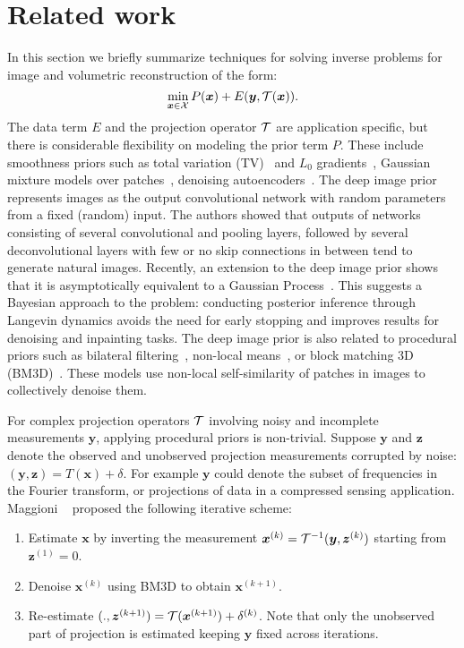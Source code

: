 \section{Related work}
\label{sec:related}

In this section we briefly summarize techniques for solving inverse problems for image and volumetric reconstruction of the form:
\begin{equation}
\label{eqn:inverse-problems}
\min_{\bm{x} \in {\cal X}} P(\bm{x}) + E(\bm{y}, {\cal T}(\bm{x})).
\end{equation}
The data term $E$ and the projection operator ${\cal T}$ are application specific, but there is considerable flexibility on modeling the prior term $P$. These include smoothness priors such as total variation (TV)~\cite{rudin1992nonlinear} and $L_0$ gradients~\cite{xu2011image}, Gaussian mixture models over patches~\cite{zoran2011learning}, denoising autoencoders~\cite{vincent2010stacked}.
The deep image prior~\cite{ulyanov17deep} represents images as the output convolutional network with random parameters from a fixed (random) input.
The authors showed that outputs of networks consisting of several convolutional and pooling layers, followed by several deconvolutional layers with few or no skip connections in between tend to generate natural images.
Recently, an extension to the deep image prior shows that it is asymptotically equivalent to a Gaussian Process~\cite{bayesiandip}.
This suggests a Bayesian approach to the problem: conducting posterior inference through Langevin dynamics avoids the need for early
stopping and improves results for denoising and inpainting tasks.
The deep image prior is also related to procedural priors such as bilateral filtering~\cite{tomasi1998bilateral}, non-local means~\cite{buades2005non}, or block matching 3D (BM3D)~\cite{dabov2007image}.
These models use non-local self-similarity of patches in images to collectively denoise them.


For complex projection operators ${\cal T}$ involving noisy and incomplete measurements $\bm{y}$, applying procedural priors is non-trivial. 
Suppose $\bm{y}$ and $\bm{z}$ denote the observed and unobserved projection measurements corrupted by noise: $(\bm{y},\bm{z}) = T(\bm{x}) + \delta$. For example $\bm{y}$ could denote the subset of frequencies in the Fourier transform, or projections of data in a compressed sensing application. Maggioni \etal~\cite{maggioni2013nonlocal} proposed the following iterative scheme: 
\begin{enumerate}
\item Estimate $\bm{x}$ by inverting the measurement $\bm{x}^{(k)}={\cal T}^{-1}(\bm{y}, \bm{z}^{(k)})$ starting from $\bm{z}^{(1)}=0$.
\item Denoise $\bm{x}^{(k)}$ using BM3D to obtain $\bm{x}^{(k+1)}$.
\item Re-estimate $(., \bm{z}^{(k+1)}) = {\cal T}(\bm{x}^{(k+1)}) + \delta^{(k)}$. Note that only the unobserved part of projection is estimated keeping $\bm{y}$ fixed across iterations.
\end{enumerate}

